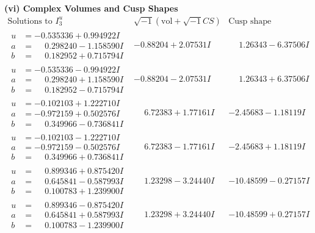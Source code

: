 \documentclass[1p]{elsarticle_modified}
\theoremstyle{definition}
\newcommand{\I}{\sqrt{-1}}
\begin{document}
\newpage\flushleft \textbf{(vi) Complex Volumes and Cusp Shapes}
$$\begin{array}{c|c|c}  
\text{Solutions to }I^u_{3}& \I (\text{vol} + \sqrt{-1}CS) & \text{Cusp shape}\\
 \hline 
\begin{aligned}
u &= -0.535336 + 0.994922 I \\
a &= \phantom{-}0.298240 - 1.158590 I \\
b &= \phantom{-}0.182952 + 0.715794 I\end{aligned}
 & -0.88204 + 2.07531 I & \phantom{-}1.26343 - 6.37506 I \\ \hline\begin{aligned}
u &= -0.535336 - 0.994922 I \\
a &= \phantom{-}0.298240 + 1.158590 I \\
b &= \phantom{-}0.182952 - 0.715794 I\end{aligned}
 & -0.88204 - 2.07531 I & \phantom{-}1.26343 + 6.37506 I \\ \hline\begin{aligned}
u &= -0.102103 + 1.222710 I \\
a &= -0.972159 + 0.502576 I \\
b &= \phantom{-}0.349966 - 0.736841 I\end{aligned}
 & \phantom{-}6.72383 + 1.77161 I & -2.45683 - 1.18119 I \\ \hline\begin{aligned}
u &= -0.102103 - 1.222710 I \\
a &= -0.972159 - 0.502576 I \\
b &= \phantom{-}0.349966 + 0.736841 I\end{aligned}
 & \phantom{-}6.72383 - 1.77161 I & -2.45683 + 1.18119 I \\ \hline\begin{aligned}
u &= \phantom{-}0.899346 + 0.875420 I \\
a &= \phantom{-}0.645841 - 0.587993 I \\
b &= \phantom{-}0.100783 + 1.239900 I\end{aligned}
 & \phantom{-}1.23298 - 3.24440 I & -10.48599 - 0.27157 I \\ \hline\begin{aligned}
u &= \phantom{-}0.899346 - 0.875420 I \\
a &= \phantom{-}0.645841 + 0.587993 I \\
b &= \phantom{-}0.100783 - 1.239900 I\end{aligned}
 & \phantom{-}1.23298 + 3.24440 I & -10.48599 + 0.27157 I \\ \hline\begin{aligned}

\end{aligned}
\end{array}$$
\end{document}
